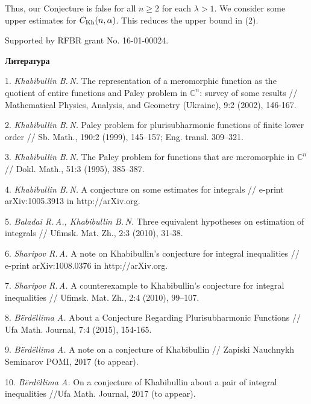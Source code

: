 Thus, our Conjecture is false for all $n\geqslant 2$ for each  $\lambda >1$. We consider some upper estimates for
$C_{{\rm Kh}}(n,\alpha)$. This reduces the upper bound in (2).

Supported by RFBR grant No. 16-01-00024.


\smallskip \centerline{\bf Литература}\nopagebreak

1. {\it Khabibullin B.\,N.\/} The representation of a meromorphic fun\-c\-t\-i\-on as the quotient of entire functions and Paley problem in $\mathbb C^n$: survey of some results // Mathematical Physics, Analysis, and Geometry (Ukraine), 9:2 (2002), 146-167.

2. {\it Khabibullin B.\,N.\/} Paley problem for plurisubharmonic fun\-c\-t\-i\-ons of finite lower order // Sb. Math., 190:2 (1999), 145--157; Eng. transl. 309–321.

3. {\it Khabibullin B.\,N.\/} The Paley problem for functions that are meromorphic in $\mathbb C^n$ // Dokl. Math., 51:3 (1995), 385–387.

4. {\it Khabibullin B.\,N.\/} A conjecture on some estimates for integr\-als // e-print arXiv:1005.3913 in http://arXiv.org.

5. {\it Baladai R.\,A., Khabibullin B.\,N.\/} Three equivalent hypotheses on estimation of integrals // Ufimsk. Mat. Zh., 2:3 (2010), 31-38.

6. {\it Sharipov R.\,A.\/} A note on Khabibullin's conjecture for integral inequalities // e-print arXiv:1008.0376 in http://arXiv.org.

7. {\it Sharipov R.\,A.\/} A counterexample to Khabibullin's conjecture for integral inequalities // Ufimsk. Mat. Zh., 2:4 (2010), 99–107.

8. {\it B\"erd\"ellima A.\/} About a Conjecture Regarding Plurisubharm\-o\-n\-ic Functions // Ufa Math. Journal, 7:4 (2015), 154-165.


9. {\it B\"erd\"ellima A.\/} A note on a conjecture of Khabibullin //
Zapiski Nauchnykh Seminarov POMI, 2017 (to appear).

10. {\it B\"erd\"ellima A.\/} On a conjecture of Khabibullin about a pair of integral inequalities //Ufa Math. Journal, 2017 (to appear).



